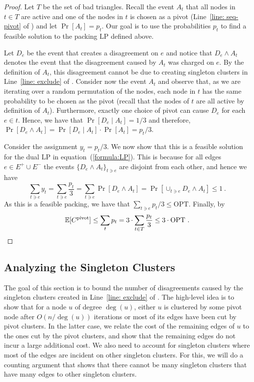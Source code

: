 \documentclass{theoretics}
\newcommand{\E}{\mathbb{E}}
\newcommand{\lp}{\textrm{LP}\xspace}
\newcommand{\ourcluster}{\ensuremath{C^{\textrm{pivot}}}\xspace}
\newcommand{\opt}{\textrm{OPT}\xspace}
\begin{document}
\begin{proof}
Let $T$ be the set of bad triangles.
Recall the event $A_t$ that all nodes in $t \in T$ are active and one of the nodes in $t$ is chosen as a pivot (Line~\ref{line: seq-pivot} of ) and let $\Pr[A_t] = p_t$.
Our goal is to use the probabilities $p_t$ to find a feasible solution to the packing \lp defined above.

Let $D_e$ be the event that  creates a disagreement on $e$ and notice that $D_e \land A_t$ denotes the event that the disagreement caused by $A_t$ was charged on $e$.
By the definition of $A_t$, this disagreement cannot be due to creating singleton clusters in Line~\ref{line: exclude} of .
Consider now the event $A_t$ and observe that, as we are iterating over a random permutation of the nodes, each node in $t$ has the same probability to be chosen as the pivot (recall that the nodes of $t$ are all active by definition of $A_t$).
Furthermore, exactly one choice of pivot can cause $D_e$ for each $e \in t$.
Hence, we have that $\Pr[D_e \mid A_t] = 1/3$ and therefore, $\Pr[D_e \land A_t] = \Pr[D_e \mid A_t] \cdot \Pr[A_t] = p_t/3$.

  Consider the assignment $y_{t} = p_{t}/3$. 
  We now show that this is a feasible solution for the dual \lp in equation~(\ref{formula:LP}). This is because for all edges $e \in E^{+} \cup E^{-}$ the events $\{D_{e} \land A_{t}\}_{t \ni e}$ are disjoint from each other, and hence we have 
  \[
    \sum_{t \ni e} y_{t} = \sum_{t \ni e} \frac{p_{t}}{3} = \sum_{t \ni e}\Pr[D_{e} \land A_{t}] = \Pr[\cup_{t \ni e}D_{e} \land A_{t}] \le 1 \ .
  \]
  As this is a feasible packing, we have that $\sum_{t \ni e} p_{t}/3 \leq \opt$.
  Finally, by  
  \[
    \E[\ourcluster] \leq \sum_{t} p_t = 3 \cdot \sum_{t \in T} \frac{p_t}{3} \leq 3 \cdot \opt \ . \qedhere
  \]
\end{proof}


\subsection{Analyzing the Singleton Clusters}\label{sec: singleton}

The goal of this section is to bound the number of disagreements caused by the singleton clusters created in Line~\ref{line: exclude} of .
The high-level idea is to show that for a node $u$ of degree $\deg(u)$, either $u$ is clustered by some pivot node after $O(n / \deg(u))$ iterations or most of its edges have been cut by pivot clusters.
In the latter case, we relate the cost of the remaining edges of $u$ to the ones cut by the pivot clusters, and show that the remaining edges do not incur a large additional cost.
We also need to account for singleton clusters where most of  the edges are incident on other singleton clusters.
For this, we will do a counting argument that shows that there cannot be many singleton clusters that have many edges to other singleton clusters.
\end{document}
